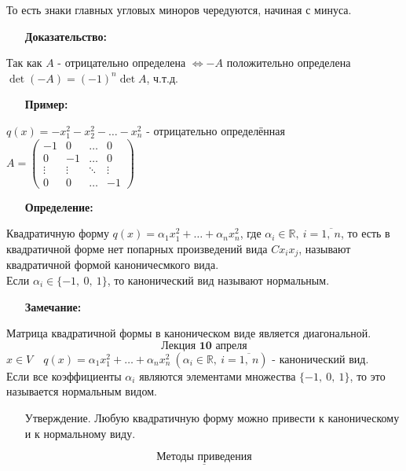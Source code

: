 \documentclass[12pt, letterpaper, twoside]{article}
\begin{document}
    То есть знаки главных угловых миноров чередуются, начиная с минуса.
    \begin{enumerate}
        \item[\textbf{Доказательство:}] 
    \end{enumerate}
    Так как $A$ - отрицательно определена $\Leftrightarrow -A$ положительно определена\\
    $\det (-A)=  (-1)^n\det A$, ч.т.д.
    \begin{enumerate}
        \item[\textbf{Пример:}]
    \end{enumerate}
    $q(x) = -x_1^2 - x_2^2 - \dots - x_n^2$ - отрицательно определённая\\
    $A = \begin{pmatrix}
        -1 & 0 & \dots & 0\\
        0 & -1 & \dots & 0\\
        \vdots & \vdots & \ddots & \vdots\\
        0 & 0 & \dots & -1
    \end{pmatrix}$
    \begin{enumerate}
        \item[\textbf{Определение:}]
    \end{enumerate}
    Квадратичную форму $q(x) = \alpha_1 x_1^2 + \dots + \alpha_n x_n^2$, где $\alpha_i\in\mathbb{R},\ i = \overline{1,\ n}$, то есть в квадратичной форме нет попарных произведений вида $Cx_ix_j$, называют квадратичной формой каноничесмкого вида.\\
    Если $\alpha_i\in \{-1,\ 0,\ 1\}$, то канонический вид называют нормальным.
    \begin{enumerate}
        \item[\textbf{Замечание:}]
    \end{enumerate}
    Матрица квадратичной формы в каноническом виде является диагональной.
    \[\textbf{Лекция 10 апреля}\]
    $x\in V\quad q(x) = \alpha_1 x_1^2 +\dots+\alpha_nx_n^2\ (\alpha_i\in \mathbb{R},\ i = \overline{1,\ n})$ - канонический вид.\\
    Если все коэффициенты $\alpha_i$ являются элементами множества $\{-1,\ 0,\ 1\}$, то это называется нормальным видом.
    \begin{enumerate}
        \item[Утверждение.] Любую квадратичную форму можно привести к каноническому и к нормальному виду. 
    \end{enumerate}
    \[\underline{\text{Методы приведения}}\]
\end{document}
